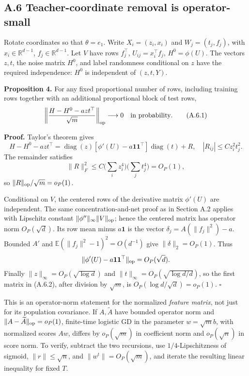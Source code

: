 \documentclass[
  11pt,
  a4paper,
]{article}
\begin{document}
\hypertarget{a.6-teacher-coordinate-removal-is-operator-small}{%
\subsection{A.6 Teacher-coordinate removal is
operator-small}\label{a.6-teacher-coordinate-removal-is-operator-small}}

Rotate coordinates so that \(\theta=e_1\). Write \(X_i=(z_i,x_i)\) and
\(W_j=(t_j,f_j)\), with \(x_i\in\mathbb R^{d-1}\),
\(f_j\in\mathbb R^{d-1}\). Let \(V\) have rows \(f_j^\top\),
\(U_{ij}=x_i^\top f_j\), \(H^0=\phi(U)\). The vectors \(z,t\), the noise
matrix \(H^0\), and label randomness conditional on \(z\) have the
required independence: \(H^0\) is independent of \((z,t,Y)\).

\textbf{Proposition 4.} For any fixed proportional number of rows,
including training rows together with an additional proportional block
of test rows, \[
\left\|\frac{H-H^0-a zt^\top}{\sqrt m}\right\|_{\rm op}\longrightarrow0
\quad\text{in probability}. \tag{A.6.1}
\]

\textbf{Proof.} Taylor's theorem gives \[
H-H^0-a zt^\top
=\operatorname{diag}(z)[\phi'(U)-a\mathbf1\mathbf1^\top]\operatorname{diag}(t)+R,
\quad |R_{ij}|\le C z_i^2t_j^2. \tag{A.6.2}
\] The remainder satisfies \[
\|R\|_F^2\le C\Big(\sum_i z_i^4\Big)\Big(\sum_jt_j^4\Big)=O_P(1),
\] so \(\|R\|_{\rm op}/\sqrt m=o_P(1)\).

Conditional on \(V\), the centered rows of the derivative matrix
\(\phi'(U)\) are independent. The same concentration-and-net proof as in
Section A.2 applies with Lipschitz constant
\(\|\phi''\|_\infty\|V\|_{\rm op}\); hence the centered matrix has
operator norm \(O_P(\sqrt d)\). Its row mean minus \(a\mathbf1\) is the
vector \(\delta_j=A(\|f_j\|^2)-a\). Bounded \(A'\) and
\(\mathbb E(\|f_j\|^2-1)^2=O(d^{-1})\) give \(\|\delta\|_2=O_P(1)\).
Thus \[
\|\phi'(U)-a\mathbf1\mathbf1^\top\|_{\rm op}=O_P(\sqrt d).
\] Finally \(\|z\|_\infty=O_P(\sqrt{\log d})\) and
\(\|t\|_\infty=O_P(\sqrt{\log d/d})\), so the first matrix in (A.6.2),
after division by \(\sqrt m\), is \(O_P(\log d/\sqrt d)=o_P(1)\).
\(\square\)

This is an operator-norm statement for the normalized \emph{feature
matrix}, not just for its population covariance. If \(A,\widetilde A\)
have bounded operator norm and \(\|A-\widetilde A\|_{\rm op}=o_P(1)\),
finite-time logistic GD in the parameter \(w=\sqrt m b\), with
normalized scores \(Aw\), differs by \(o_P(\sqrt m)\) in coefficient
norm and \(o_P(\sqrt n)\) in score norm. To verify, subtract the two
recursions, use \(1/4\)-Lipschitzness of sigmoid, \(\|r\|\le\sqrt n\),
and \(\|w^t\|=O_P(\sqrt m)\), and iterate the resulting linear
inequality for fixed \(T\).
\end{document}
